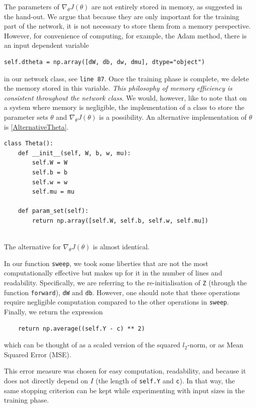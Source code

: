 \documentclass{article}
\begin{document}
The parameters of $\nabla_\theta J(\theta)$ are not entirely stored in memory, as suggested in the hand-out. We argue that because they are only important for the training part of the network, it is not necessary to store them from a memory perspective. However, for convenience of computing, for example, the Adam method, there is an input dependent variable 
\begin{verbatim}
self.dtheta = np.array([dW, db, dw, dmu], dtype="object")
\end{verbatim} 
in our network class, see \verb|line 87|. Once the training phase is complete, we delete the memory stored in this variable. \textit{This philosophy of memory efficiency is consistent throughout the network class}. We would, however, like to note that on a system where memory is negligible, the implementation of a class to store the parameter sets $\theta$ and $\nabla_\theta J(\theta)$ is a possibility. An alternative implementation of $\theta$ is \autoref{AlternativeTheta}.
\begin{lstlisting}
class Theta():
    def __init__(self, W, b, w, mu):
        self.W = W
        self.b = b
        self.w = w
        self.mu = mu
    
    def param_set(self):
        return np.array([self.W, self.b, self.w, self.mu])
        
\end{lstlisting}
The alternative for $\nabla_\theta J(\theta)$ is almost identical. 

In our function \verb|sweep|, we took some liberties that are not the most computationally effective but makes up for it in the number of lines and readability. Specifically, we are referring to the re-initialisation of \verb|Z| (through the function \verb|forward|), \verb|dW| and \verb|db|. However, one should note that these operations require negligible computation compared to the other operations in \verb|sweep|. Finally, we return the expression
\begin{lstlisting}
    return np.average((self.Y - c) ** 2)
\end{lstlisting}
which can be thought of as a scaled version of the squared $l_2$-norm, or as Mean Squared Error (MSE).

This error measure was chosen for easy computation, readability, and because it does not directly depend on $I$ (the length of \verb|self.Y| and \verb|c|). In that way, the same stopping criterion can be kept while experimenting with input sizes in the training phase.
\end{document}
